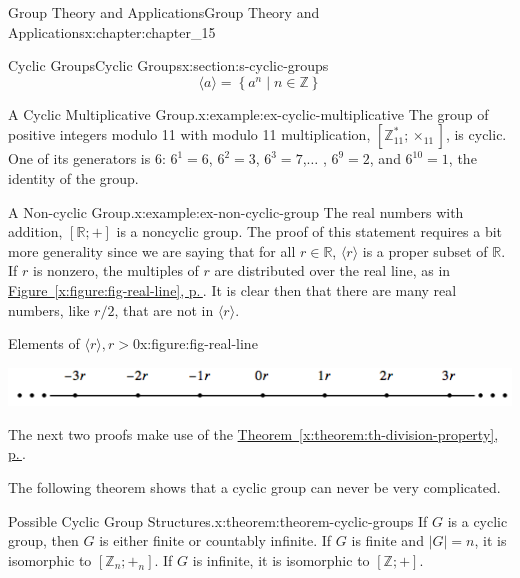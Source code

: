 \documentclass[twoside,10pt,]{book}
\newcommand{\xreffont}{\relax}
\numberwithin{equation}{section}
\begin{document}
\begin{chapterptx}{Group Theory and Applications}{}{Group Theory and Applications}{}{}{x:chapter:chapter_15}
\begin{sectionptx}{Cyclic Groups}{}{Cyclic Groups}{}{}{x:section:s-cyclic-groups}
\begin{equation*}
\langle a \rangle = \left\{a^n \mid n \in  \mathbb{Z}\right\}
\end{equation*}
%
\begin{example}{A Cyclic Multiplicative Group.}{x:example:ex-cyclic-multiplicative}%
The group of positive integers modulo 11 with modulo 11 multiplication, \([\mathbb{Z}_{11}^* ;\times_{11}]\), is cyclic. One of its generators is 6:  \(6^1 = 6\), \(6^2 = 3\), \(6^3= 7\),\(\ldots\) , \(6^9=2\), and \(6^{10}=1\), the identity of the group.%
\end{example}
\begin{example}{A Non-cyclic Group.}{x:example:ex-non-cyclic-group}%
The real numbers with addition, \([\mathbb{R};+]\) is a noncyclic group. The proof of this statement requires a bit more generality since we are saying that for all  \(r \in  \mathbb{R}\), \(\langle r \rangle\) is a proper subset of \(\mathbb{R}\). If \(r\) is nonzero, the multiples of \(r\) are distributed over the real line, as in \hyperref[x:figure:fig-real-line]{Figure~{\xreffont\ref{x:figure:fig-real-line}}, p.\,\pageref{x:figure:fig-real-line}}. It is clear then that there are many real numbers, like \(r/2\), that are not in \(\langle r \rangle\).%
\begin{figureptx}{Elements of \(\langle r \rangle, r > 0\)}{x:figure:fig-real-line}{}%
\begin{image}{0.1}{0.8}{0.1}%
\includegraphics[width=\linewidth]{images/fig-real-line.png}
\end{image}%
\tcblower
\end{figureptx}%
\end{example}
The next two proofs  make use of the \hyperref[x:theorem:th-division-property]{Theorem~{\xreffont\ref{x:theorem:th-division-property}}, p.\,\pageref{x:theorem:th-division-property}}.%
\par
The following theorem shows that a cyclic group can never be very complicated.%
\begin{theorem}{Possible Cyclic Group Structures.}{}{x:theorem:theorem-cyclic-groups}%
If \(G\) is a cyclic group, then \(G\) is either finite or countably infinite. If \(G\) is finite and \(\lvert G\rvert=n\), it is isomorphic to \([\mathbb{Z}_n; +_n]\). If \(G\) is infinite, it is isomorphic to \([\mathbb{Z};+]\).%
\end{theorem}

\end{sectionptx}
\end{chapterptx}
\end{document}
